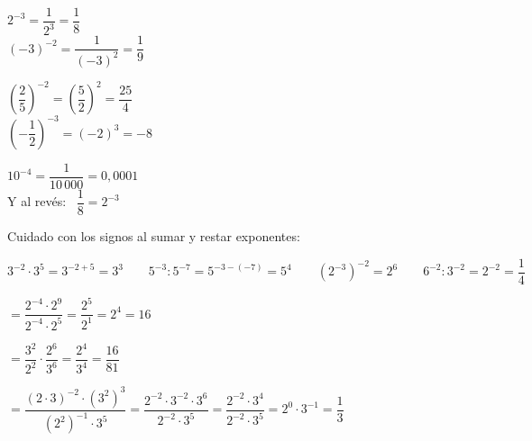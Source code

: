 \documentclass[11pt,a4paper]{article}
\begin{document}
\vfill
\begin{exemple}[Ejemplos]
\begin{minipage}[t]{0.32\linewidth}
$2^{-3}=\dfrac{1}{2^{3}}=\dfrac18$\\[5pt]
$(-3)^{-2}=\dfrac{1}{(-3)^{2}}=\dfrac19$
\end{minipage}\hfill
\begin{minipage}[t]{0.32\linewidth}
$\left(\dfrac25\right)^{-2}=\left(\dfrac52\right)^{2}=\dfrac{25}{4}$\\[5pt]
$\left(-\dfrac12\right)^{-3}=(-2)^{3}=-8$
\end{minipage}\hfill
\begin{minipage}[t]{0.32\linewidth}
$10^{-4}=\dfrac{1}{10\,000}=0{,}0001$\\[5pt]
Y al revés: \ $\dfrac18=2^{-3}$
\end{minipage}
\end{exemple}

\vfill
\begin{idea}
Cuidado con los signos al sumar y restar exponentes:\\[4pt]
{\centering$3^{-2}\cdot3^{5}=3^{-2+5}=3^{3}\qquad 5^{-3}:5^{-7}=5^{-3-(-7)}=5^{4}\qquad \left(2^{-3}\right)^{-2}=2^{6}\qquad 6^{-2}:3^{-2}=2^{-2}=\dfrac14$\par}
\end{idea}

\vfill
\begin{minipage}[t]{0.49\linewidth}
\begin{exemple}
$=\dfrac{2^{-4}\cdot2^{9}}{2^{-4}\cdot2^{5}}=\dfrac{2^{5}}{2^{1}}=2^{4}=\boxed{16}$
\end{exemple}
\end{minipage}\hfill
\begin{minipage}[t]{0.48\linewidth}
\begin{exemple}
$=\dfrac{3^{2}}{2^{2}}\cdot\dfrac{2^{6}}{3^{6}}=\dfrac{2^{4}}{3^{4}}=\boxed{\dfrac{16}{81}}$
\end{exemple}
\end{minipage}

\vfill
\begin{exemple}
$=\dfrac{(2\cdot3)^{-2}\cdot\left(3^{2}\right)^{3}}{\left(2^{2}\right)^{-1}\cdot3^{5}}=\dfrac{2^{-2}\cdot3^{-2}\cdot3^{6}}{2^{-2}\cdot3^{5}}=\dfrac{2^{-2}\cdot3^{4}}{2^{-2}\cdot3^{5}}=2^{0}\cdot3^{-1}=\boxed{\dfrac13}$
\end{exemple}
\end{document}
